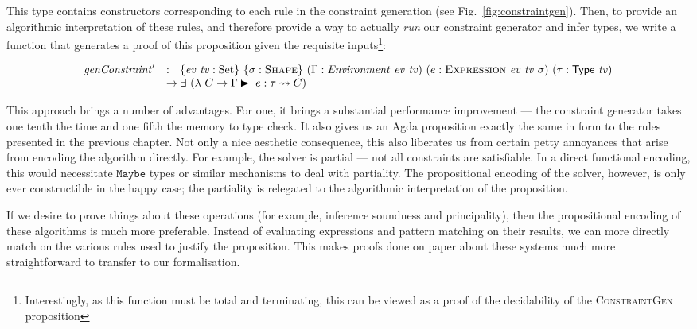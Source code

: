 \documentclass[a4paper]{jfp}
\begin{document}
This type contains constructors corresponding to each rule in the constraint generation (see Fig.~\ref{fig:constraintgen}). Then, to provide an
algorithmic interpretation of these rules, and therefore provide a way to actually \emph{run} our constraint generator and infer types, we write a
function that generates a proof of this proposition given the requisite inputs\footnote{Interestingly, as this function must be total and terminating,
   this can be viewed as a proof of the decidability of the \textsc{ConstraintGen} proposition}:

\begin{displaymath}
   \begin{array}{ll}
   \mathit{genConstraint}' & :\ \ \{\mathit{ev\ tv} : \text{Set}\}\ \{\sigma : \textsc{Shape}\}\ 
                  (\Gamma : \mathit{Environment}\ \mathit{ev}\ \mathit{tv})\ (e : \textsc{Expression}\ \mathit{ev}\ \mathit{tv}\ \sigma)\ (\tau :
                  \textsf{Type}\ \mathit{tv}) \\ & \rightarrow \exists\ (\lambda\ C \rightarrow \Gamma \vdasharrow e : \tau \leadsto C)
   \end{array}
\end{displaymath}   

This approach brings a number of advantages. For one, it brings a substantial performance improvement --- the constraint generator takes one tenth the
time and one fifth the memory to type check. It also gives us an Agda proposition exactly the same in form to the rules presented in the previous
chapter. Not only a nice aesthetic consequence, this also liberates us from certain petty annoyances that arise from encoding the algorithm directly.
For example, the solver is partial --- not all constraints are satisfiable. In a direct functional encoding, this would necessitate
$\mathtt{Maybe}$ types or similar mechanisms to deal with partiality. The propositional encoding of the solver, however, is only ever constructible in
the happy case; the partiality is relegated to the algorithmic interpretation of the proposition.

If we desire to prove things about these operations (for example, inference soundness and principality), then the propositional encoding of these
algorithms is much more preferable. Instead of evaluating expressions and pattern matching on their results, we can more directly match on the various
rules used to justify the proposition. This makes proofs done on paper about these systems much more straightforward to transfer to our formalisation.
\end{document}
